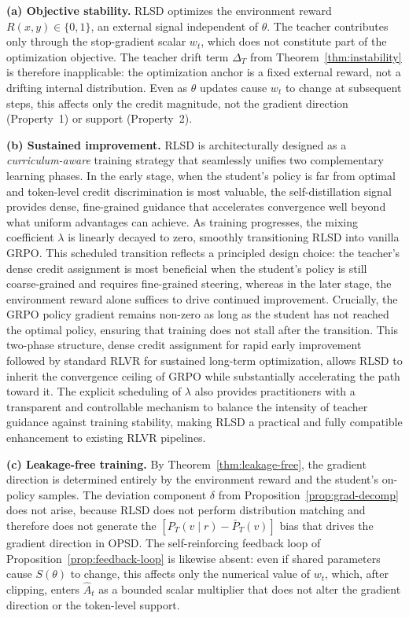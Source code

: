 \documentclass[]{jingdong}
\begin{document}
\noindent \textbf{(a) Objective stability.}
RLSD optimizes the environment reward $R(x, y) \in \{0, 1\}$, an external signal independent of $\theta$. The teacher contributes only through the stop-gradient scalar $w_t$, which does not constitute part of the optimization objective. The teacher drift term $\Delta_T$ from Theorem~\ref{thm:instability} is therefore inapplicable: the optimization anchor is a fixed external reward, not a drifting internal distribution. Even as $\theta$ updates cause $w_t$ to change at subsequent steps, this affects only the credit magnitude, not the gradient direction (Property~1) or support (Property~2).

\noindent \textbf{(b) Sustained improvement.}
RLSD is architecturally designed as a \textit{curriculum-aware} training strategy that seamlessly unifies two complementary learning phases. In the early stage, when the student's policy is far from optimal and token-level credit discrimination is most valuable, the self-distillation signal provides dense, fine-grained guidance that accelerates convergence well beyond what uniform advantages can achieve. As training progresses, the mixing coefficient $\lambda$ is linearly decayed to zero, smoothly transitioning RLSD into vanilla GRPO. This scheduled transition reflects a principled design choice: the teacher's dense credit assignment is most beneficial when the student's policy is still coarse-grained and requires fine-grained steering, whereas in the later stage, the environment reward alone suffices to drive continued improvement. Crucially, the GRPO policy gradient remains non-zero as long as the student has not reached the optimal policy, ensuring that training does not stall after the transition. This two-phase structure, dense credit assignment for rapid early improvement followed by standard RLVR for sustained long-term optimization, allows RLSD to inherit the convergence ceiling of GRPO while substantially accelerating the path toward it. The explicit scheduling of $\lambda$ also provides practitioners with a transparent and controllable mechanism to balance the intensity of teacher guidance against training stability, making RLSD a practical and fully compatible enhancement to existing RLVR pipelines.

\noindent \textbf{(c) Leakage-free training.}
By Theorem~\ref{thm:leakage-free}, the gradient direction is determined entirely by the environment reward and the student's on-policy samples. The deviation component $\delta$ from Proposition~\ref{prop:grad-decomp} does not arise, because RLSD does not perform distribution matching and therefore does not generate the $[P_T(v \mid r) - \bar{P}_T(v)]$ bias that drives the gradient direction in OPSD. The self-reinforcing feedback loop of Proposition~\ref{prop:feedback-loop} is likewise absent: even if shared parameters cause $S(\theta)$ to change, this affects only the numerical value of $w_t$, which, after clipping, enters $\hat{A}_t$ as a bounded scalar multiplier that does not alter the gradient direction or the token-level support.
\end{document}
